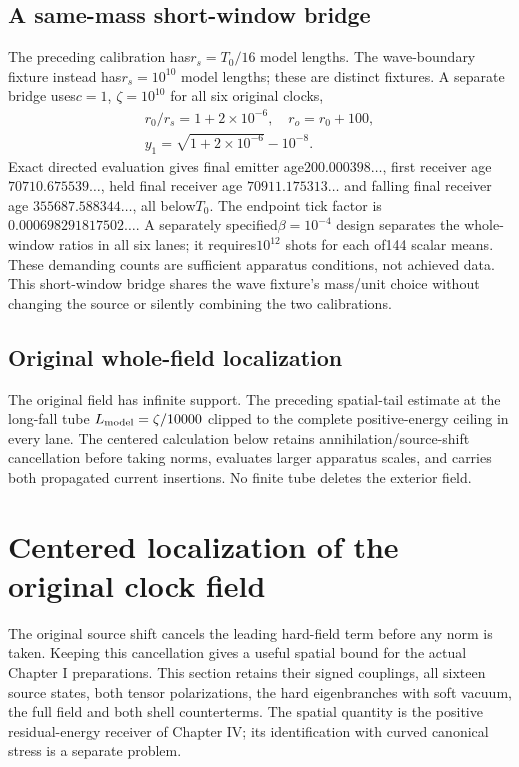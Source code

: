 \documentclass[10pt,twocolumn,letterpaper]{article}
\begin{document}
\subsection{A same-mass short-window bridge}
The preceding calibration has$r_s=T_0/16$ model lengths. The wave-boundary
fixture instead has$r_s=10^{10}$ model lengths; these are distinct fixtures.
A separate bridge uses$c=1$, $\zeta=10^{10}$ for all six original clocks,
\[
\begin{gathered}r_0/r_s=1+2\times10^{-6},\quad r_o=r_0+100,\\
 y_1=\sqrt{1+2\times10^{-6}}-10^{-8}.\end{gathered}
\]
Exact directed evaluation gives final emitter age$200.000398\ldots$,
first receiver age$70710.675539\ldots$, held final receiver age
$70911.175313\ldots$ and falling final receiver age
$355687.588344\ldots$, all below$T_0$. The endpoint tick factor is
$0.000698291817502\ldots$. A separately specified$\beta=10^{-4}$ design
separates the whole-window ratios in all six lanes; it requires$10^{12}$
shots for each of144 scalar means. These demanding counts are sufficient
apparatus conditions, not achieved data. This short-window bridge shares the
wave fixture's mass/unit choice without changing the source or silently
combining the two calibrations.

\subsection{Original whole-field localization}
The original field has infinite support. The preceding spatial-tail estimate at the long-fall tube $L_{\rm model}=\zeta/10000$ clipped to the complete positive-energy ceiling in every lane. The centered calculation below retains annihilation/source-shift cancellation before taking norms, evaluates larger apparatus scales, and carries both propagated current insertions. No finite tube deletes the exterior field.

\section{Centered localization of the original clock field}
\label{sec:centered-clock-localization}
The original source shift cancels the leading hard-field term before any
norm is taken.  Keeping this cancellation gives a useful spatial bound for
the actual Chapter I preparations.  This section retains their signed
couplings, all sixteen source states, both tensor polarizations, the hard
eigenbranches with soft vacuum, the full field and both shell counterterms.
The spatial quantity is the positive residual-energy receiver of Chapter IV;
its identification with curved canonical stress is a separate problem.
\end{document}
